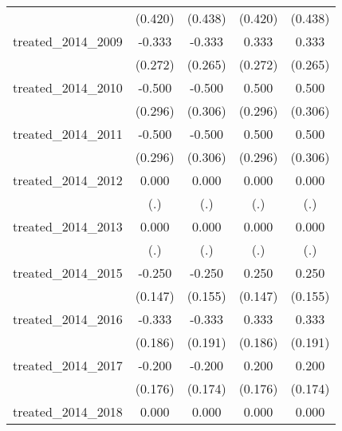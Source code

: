 {\begin{tabular}{l*{4}{c}}
            &     (0.420)         &     (0.438)         &     (0.420)         &     (0.438)         \\
[1em]
treated\_2014\_2009&      -0.333         &      -0.333         &       0.333         &       0.333         \\
            &     (0.272)         &     (0.265)         &     (0.272)         &     (0.265)         \\
[1em]
treated\_2014\_2010&      -0.500         &      -0.500         &       0.500         &       0.500         \\
            &     (0.296)         &     (0.306)         &     (0.296)         &     (0.306)         \\
[1em]
treated\_2014\_2011&      -0.500         &      -0.500         &       0.500         &       0.500         \\
            &     (0.296)         &     (0.306)         &     (0.296)         &     (0.306)         \\
[1em]
treated\_2014\_2012&       0.000         &       0.000         &       0.000         &       0.000         \\
            &         (.)         &         (.)         &         (.)         &         (.)         \\
[1em]
treated\_2014\_2013&       0.000         &       0.000         &       0.000         &       0.000         \\
            &         (.)         &         (.)         &         (.)         &         (.)         \\
[1em]
treated\_2014\_2015&      -0.250         &      -0.250         &       0.250         &       0.250         \\
            &     (0.147)         &     (0.155)         &     (0.147)         &     (0.155)         \\
[1em]
treated\_2014\_2016&      -0.333         &      -0.333         &       0.333         &       0.333         \\
            &     (0.186)         &     (0.191)         &     (0.186)         &     (0.191)         \\
[1em]
treated\_2014\_2017&      -0.200         &      -0.200         &       0.200         &       0.200         \\
            &     (0.176)         &     (0.174)         &     (0.176)         &     (0.174)         \\
[1em]
treated\_2014\_2018&       0.000         &       0.000         &       0.000         &       0.000         \\

\end{tabular}}

